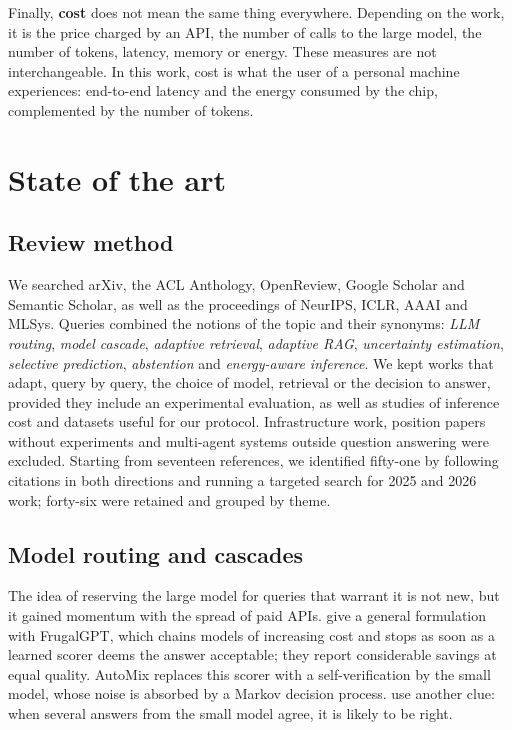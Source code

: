 \documentclass[11pt,a4paper]{article}
\begin{document}
Finally, \textbf{cost} does not mean the same thing everywhere. Depending on the work, it is the price
charged by an API, the number of calls to the large model, the number of tokens, latency, memory or
energy. These measures are not interchangeable. In this work, cost is what the user of a personal
machine experiences: end-to-end latency and the energy consumed by the chip, complemented by the number
of tokens.

\section{State of the art}\label{sec:etat}

\subsection{Review method}

We searched arXiv, the ACL Anthology, OpenReview, Google Scholar and Semantic Scholar, as well as the
proceedings of NeurIPS, ICLR, AAAI and MLSys. Queries combined the notions of the topic and their
synonyms: \textit{LLM routing}, \textit{model cascade}, \textit{adaptive retrieval}, \textit{adaptive
RAG}, \textit{uncertainty estimation}, \textit{selective prediction}, \textit{abstention} and
\textit{energy-aware inference}. We kept works that adapt, query by query, the choice of model,
retrieval or the decision to answer, provided they include an experimental evaluation, as well as
studies of inference cost and datasets useful for our protocol. Infrastructure work, position papers
without experiments and multi-agent systems outside question answering were excluded. Starting from
seventeen references, we identified fifty-one by following citations in both directions and running a
targeted search for 2025 and 2026 work; forty-six were retained and grouped by theme.

\subsection{Model routing and cascades}

The idea of reserving the large model for queries that warrant it is not new, but it gained momentum
with the spread of paid APIs. \citet{chen2023frugalgpt} give a general formulation with FrugalGPT,
which chains models of increasing cost and stops as soon as a learned scorer deems the answer
acceptable; they report considerable savings at equal quality. AutoMix \citep{aggarwal2023automix}
replaces this scorer with a self-verification by the small model, whose noise is absorbed by a Markov
decision process. \citet{yue2023cascades} use another clue: when several answers from the small model
agree, it is likely to be right.
\end{document}
